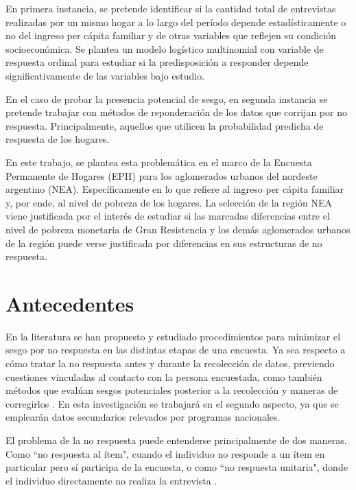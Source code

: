 \documentclass{article}
\begin{document}
En primera instancia, se pretende identificar si la cantidad total de entrevistas realizadas por un mismo hogar a lo largo del período depende estadísticamente o no del ingreso per cápita familiar y de otras variables que reflejen su condición socioeconómica. Se plantea un modelo logístico multinomial con variable de respuesta ordinal para estudiar si la predisposición a responder depende significativamente de las variables bajo estudio. \cite{handbook} \cite{korinek07}

En el caso de probar la presencia potencial de sesgo, en segunda instancia se pretende trabajar con métodos de reponderación de los datos que corrijan por no respuesta. Principalmente, aquellos que utilicen la probabilidad predicha de respuesta de los hogares.

En este trabajo, se plantea esta problemática en el marco de la Encuesta Permanente de Hogares (EPH) para los aglomerados urbanos del nordeste argentino (NEA). Específicamente en lo que refiere al ingreso per cápita familiar y, por ende, al nivel de pobreza de los hogares. La selección de la región NEA viene justificada por el interés de estudiar si las marcadas diferencias entre el nivel de pobreza monetaria de Gran Resistencia y los demás aglomerados urbanos de la región puede verse justificada por diferencias en sus estructuras de no respuesta.

\section{Antecedentes}

En la literatura se han propuesto y estudiado procedimientos para minimizar el sesgo por no respuesta en las distintas etapas de una encuesta. Ya sea respecto a cómo tratar la no respuesta antes y durante la recolección de datos, previendo cuestiones vinculadas al contacto con la persona encuestada, como también métodos que evalúan sesgos potenciales posterior a la recolección y maneras de corregirlos \cite{plansurvey05} \cite{plansurvey06}. En esta investigación se trabajará en el segundo aspecto, ya que se emplearán datos secundarios relevados por programas nacionales.

El problema de la no respuesta puede entenderse principalmente de dos maneras. Como ``no respuesta al ítem", cuando el individuo no responde a un ítem en particular pero sí participa de la encuesta, o como ``no respuesta unitaria", donde el individuo directamente no realiza la entrevista \cite{korinek07}.
\end{document}
